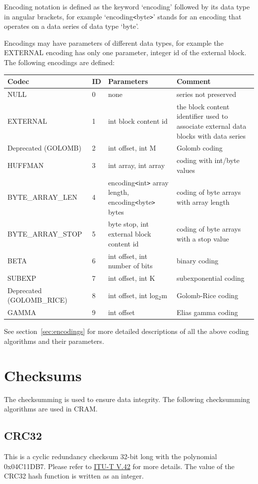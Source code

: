 \documentclass[a4paper]{article}
\begin{document}
Encoding notation is defined as the keyword `encoding' followed by its data type 
in angular brackets, for example `encoding\texttt{<}byte\texttt{>}' stands for 
an encoding that operates on a data series of data type `byte'. 

Encodings may have parameters of different data types, for example the EXTERNAL 
encoding has only one parameter, integer id of the external block. The following 
encodings are defined: 

\begin{tabular}{|l|l|>{\raggedright}p{155pt}|>{\raggedright}p{160pt}|}
\hline
\textbf{Codec} & \textbf{ID} & \textbf{Parameters} & \textbf{Comment}\tabularnewline
\hline
NULL & 0 & none & series not preserved\tabularnewline
\hline
EXTERNAL & 1 & int block content id & the block content identifier used to associate 
external data blocks with data series\tabularnewline
\hline
Deprecated (GOLOMB) & 2 & int offset, int M & Golomb coding\tabularnewline
\hline
HUFFMAN & 3 & int array, int array & coding with int/byte values\tabularnewline
\hline
BYTE\_ARRAY\_LEN & 4 & encoding\texttt{<}int\texttt{>} array length, encoding\texttt{<}byte\texttt{>} 
bytes & coding of byte arrays with array length\tabularnewline
\hline
BYTE\_ARRAY\_STOP & 5 & byte stop, int external block\linebreak{}
content id & coding of byte arrays with a stop value \tabularnewline
\hline
BETA & 6 & int offset, int number of bits & binary coding\tabularnewline
\hline
SUBEXP & 7 & int offset, int K & subexponential coding\tabularnewline
\hline
Deprecated (GOLOMB\_RICE) & 8 & int offset, int log$_{\text{2}}$m & Golomb-Rice coding\tabularnewline
\hline
GAMMA & 9 & int offset & Elias gamma coding\tabularnewline
\hline
\end{tabular}

See section~\ref{sec:encodings} for more detailed descriptions of all the above coding algorithms and their parameters.

\section{\textbf{Checksums}}
The checksumming is used to ensure data integrity. The following checksumming algorithms are used in CRAM.
\subsection{\textbf{CRC32}}
This is a cyclic redundancy checksum 32-bit long with the polynomial 0x04C11DB7. Please refer to \href{http://www.itu.int/rec/recommendation.asp?type=folders&lang=e&parent=T-REC-V.42}{ITU-T V.42} for more details. The value of the CRC32 hash function is written as an integer.
\end{document}

